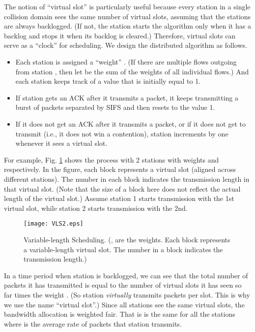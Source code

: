 \documentclass[letterpaper, 10 pt, conference]{ieeeconf}
\begin{document}
The notion of {}``virtual slot'' is particularly useful because every station in
a single collision domain sees the same number of virtual slots, assuming
that the stations are always backlogged. (If not, the station starts the algorithm
only when it has a backlog and stops it when its backlog
is cleared.) Therefore, virtual slots can serve as a {}``clock'' for scheduling.
We design the distributed algorithm as follows.

\begin{itemize}
\item Each station  is assigned a ``weight''  \cite{DFS}. (If there are multiple flows outgoing 
from station , then let  be the sum of the weights of all individual flows.) And each station  keeps track of a value  that is initially equal to 1.

\item If station  gets an ACK after it transmits a packet, it keeps transmitting a burst of  packets separated by SIFS and then resets  to the value 1. 

\item If it does not get an ACK after it transmits a packet, or if it does not get to transmit (i.e., it does not win a contention), station  increments  by one
whenever it sees a virtual slot.

\end{itemize}

For example, Fig. \ref{fig:VLS_2sta} shows the process with 2 stations with weights  and  respectively. In the figure, each block represents a virtual slot (aligned across different stations). The number in each block indicates the transmission length in that virtual slot. (Note that the size of a block here does not reflect the actual length of the virtual slot.) Assume station 1 starts transmission with the 1st virtual slot, while station 2 starts transmission with the 2nd.

\begin{figure}
\noindent \begin{centering}
\texttt{[image: VLS2.eps]}
\end{centering}
\caption{\label{fig:VLS_2sta}Variable-length Scheduling. (,  are the weights. Each block represents a variable-length virtual slot. The number in a block indicates the transmission length.)}
\end{figure}

In a time period when station  is backlogged, we can see that
the total number of packets it has transmitted is equal to the number
of virtual slots it has seen so far times the weight . (So station  {\em virtually} transmits  packets per slot. This is why we use the name ``virtual slot''.)
Since all stations see the same virtual slots, the bandwidth allocation
is weighted fair. That is  is the same for all the stations where
 is the average rate of packets that station  transmits.
\end{document}
